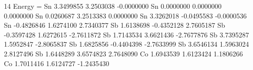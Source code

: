 14
Energy =
Sn    3.3499855    3.2503038   -0.0000000
Sn    0.0000000    0.0000000    0.0000000
Sn    0.0260687    3.2513383    0.0000000
Sn    3.3262018   -0.0495583   -0.0000536
Sn   -0.4826846    1.6274100    2.7340377
Sb    1.6138698   -0.4352128    2.7605187
Sb   -0.3597428    1.6272615   -2.7611872
Sb    1.7143534    3.6621436   -2.7677876
Sb    3.7395287    1.5952847   -2.8065837
Sb    1.6825856   -0.4404398   -2.7633999
Sb    3.6546134    1.5963024    2.8127496
Sb    1.6448289    3.6574823    2.7648090
Co    1.6943539    1.6123424    1.1806266
Co    1.7011416    1.6124727   -1.2435430